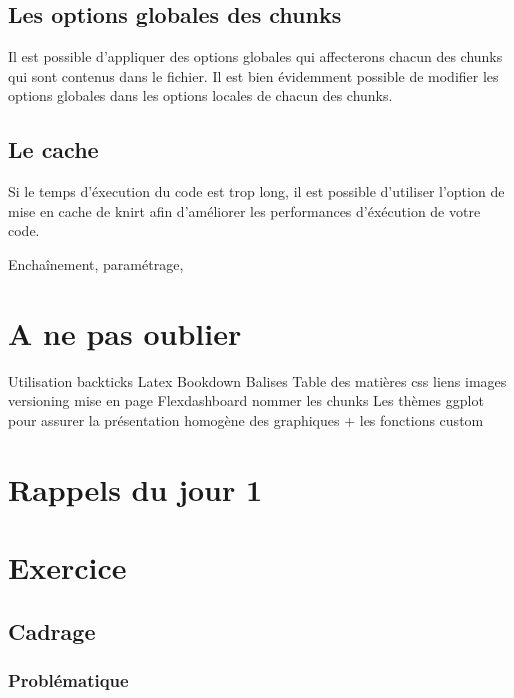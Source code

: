 \documentclass[]{article}
\begin{document}
\subsection{Les options globales des
chunks}\label{les-options-globales-des-chunks}

Il est possible d'appliquer des options globales qui affecterons chacun
des chunks qui sont contenus dans le fichier. Il est bien évidemment
possible de modifier les options globales dans les options locales de
chacun des chunks.

\subsection{Le cache}\label{le-cache}

Si le temps d'éxecution du code est trop long, il est possible
d'utiliser l'option de mise en cache de knirt afin d'améliorer les
performances d'éxécution de votre code.

Enchaînement, paramétrage,

\section{}\label{section-1}

\section{A ne pas oublier}\label{a-ne-pas-oublier}

Utilisation backticks Latex Bookdown Balises Table des matières css
liens images versioning mise en page Flexdashboard nommer les chunks Les
thèmes ggplot pour assurer la présentation homogène des graphiques + les
fonctions custom

\section{Rappels du jour 1}\label{rappels-du-jour-1}

\section{Exercice}\label{exercice}

\subsection{Cadrage}\label{cadrage}

\subsubsection{Problématique}\label{problematique}
\end{document}
